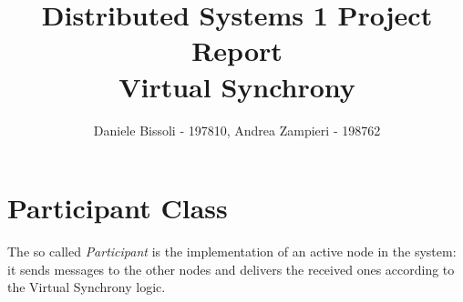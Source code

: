 \documentclass[11pt]{article}
\title{\LARGE{\textbf{Distributed Systems 1 Project Report\\\small{Virtual Synchrony}}}}
\author{Daniele Bissoli - 197810, Andrea Zampieri - 198762}
\date{}
\begin{document}
	\maketitle
	
	\section{Participant Class}
		The so called \textit{Participant} is the implementation of an active node in the system: it sends messages to the other nodes and delivers the received ones according to the Virtual Synchrony logic.
	
		
\end{document}
